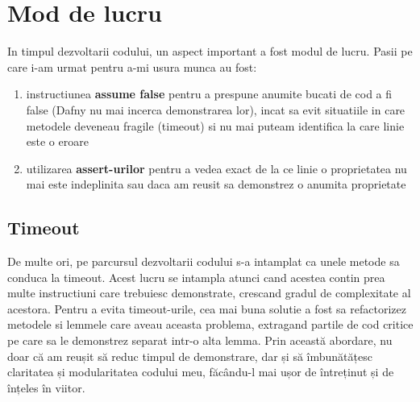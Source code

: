 \section{Mod de lucru}
In timpul dezvoltarii codului, un aspect important a fost modul de lucru. Pasii pe care i-am urmat pentru a-mi usura munca au fost:
\begin{enumerate}
    \item instructiunea \textbf{assume false} pentru a prespune anumite bucati de cod a fi false (Dafny nu mai incerca demonstrarea lor), incat sa evit situatiile in care metodele deveneau fragile (timeout) si nu mai puteam identifica la care linie este o eroare
    \item utilizarea \textbf{assert-urilor} pentru a vedea exact de la ce linie o proprietatea nu mai este indeplinita sau daca am reusit sa demonstrez o anumita proprietate
\end{enumerate}
\subsection{Timeout}
De multe ori, pe parcursul dezvoltarii codului s-a intamplat ca unele metode sa conduca la timeout. Acest lucru se intampla atunci cand acestea contin prea multe instructiuni care trebuiesc demonstrate, crescand gradul de complexitate al acestora.
Pentru a evita timeout-urile, cea mai buna solutie a fost sa refactorizez metodele si lemmele care aveau aceasta problema, extragand partile de cod critice pe care sa le demonstrez separat intr-o alta lemma. Prin această abordare, nu doar că am reușit să reduc timpul de demonstrare, dar și să îmbunătățesc claritatea și modularitatea codului meu, făcându-l mai ușor de întreținut și de înțeles în viitor.








